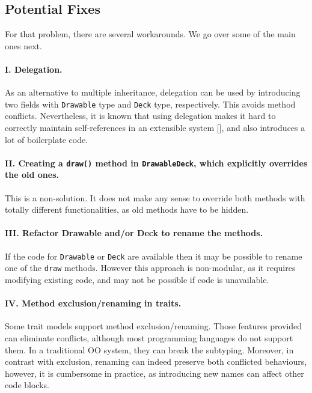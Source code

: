 \subsection{Potential Fixes}

For that problem, there are several workarounds. We go over some of
the main ones next.

\paragraph{I. Delegation.} As an alternative to multiple inheritance,
delegation can be used by introducing two fields with
\lstinline|Drawable| type and \lstinline|Deck| type,
respectively. This avoids method conflicts. Nevertheless, it is known
that using delegation makes it hard to correctly maintain
self-references  in an extensible system [], and also
introduces a lot of boilerplate code.

\paragraph{II. Creating a \lstinline|draw()| method in \lstinline|DrawableDeck|, which explicitly overrides the old ones.}
This is a non-solution. It does not make any sense to override both methods with totally different functionalities, as old
methods have to be hidden.

\paragraph{III. Refactor Drawable and/or Deck to rename the methods.} If
the code for \lstinline|Drawable| or \lstinline|Deck| are available
then it may be possible to rename one of the \lstinline|draw|
methods. However this approach is non-modular, as it requires 
modifying existing code, and may not be possible if code is unavailable.


\paragraph{IV. Method exclusion/renaming in traits.} Some trait models
support method exclusion/renaming. Those features
provided can eliminate conflicts, although most
programming languages do not support them. In a traditional OO system,
they can break the subtyping. Moreover, in
contrast with exclusion, renaming can indeed preserve both conflicted
behaviours, however, it is cumbersome in practice, as introducing new
names can affect other code blocks.

